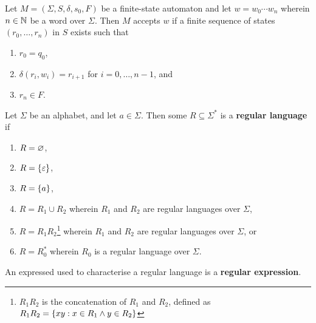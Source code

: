 Let \(M = (\varSigma, S, \delta, s_0, F)\) be a finite-state automaton and let
\(w = w_0 \cdots w_n\) wherein \(n \in \mathbb{N}\) be a word over \(\varSigma\).
Then \(M\) accepts \(w\) if a finite sequence of states \((r_0, \ldots, r_n)\)
in \(S\) exists such that
\begin{enumerate}
    \item \(r_0 = q_0\),
    \item \(\delta(r_i, w_i) = r_{i + 1}\) for \(i = 0, \ldots, n - 1\), and
    \item \(r_n \in F\).
\end{enumerate}

\Bdf
    Let \(\varSigma\) be an alphabet, and let \(a \in \varSigma\). Then some \(R
    \subseteq \varSigma^*\) is a {\bf regular language} if
    \begin{enumerate}
        \item \(R = \varnothing\),
        \item \(R = \{\varepsilon\}\),
        \item \(R = \{a\}\),
        \item \(R = R_1 \cup R_2\) wherein \(R_1\) and \(R_2\) are regular
        languages over \(\varSigma\),
        \item \(R = R_1 R_2\)\footnote{\(R_1 R_2\) is the concatenation of
        \(R_1\) and \(R_2\), defined as \(R_1 R_2 = \{x y : x \in R_1 \land y
        \in R_2\}\)} wherein \(R_1\) and \(R_2\) are regular languages over
        \(\varSigma\), or
        \item \(R = R_0^*\) wherein \(R_0\) is a regular language over
        \(\varSigma\).
    \end{enumerate}
\Edf

An expressed used to characterise a regular language is a {\bf regular
expression}.

\Edc